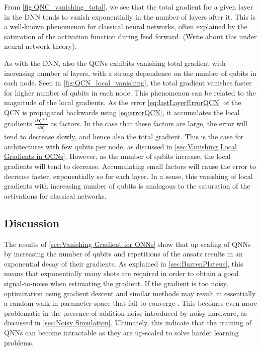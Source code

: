 From \autoref{fig:QNC_vanishing_total}, we see that the total gradient for a given layer in the DNN tends to vanish exponentially in the number of layers after it. This is a well-known phenomenon for classical neural networks, often explained by the saturation of the activation function during feed forward\cite{shalevshwartz2017failures}. (Write about this under neural network theory).

As with the DNN, also the QCNs exhibits vanishing total gradient with increasing number of layers, with a strong dependence on the number of qubits in each node. Seen in \autoref{fig:QCN_local_vanishing}, the total gradient vanishes faster for higher number of qubits in each node. This phenomenon can be related to the magnitude of the local gradients. As the error \autoref{eq:lastLayerErrorQCN} of the QCN is propagated backwards using \autoref{eq:errorQCN}, it accumulates the local gradients $\frac{\partial \boldsymbol{a}^{l+1}_k}{\partial \boldsymbol{a}^{l}_j}$ as factors. In the case that these factors are large, the error will tend to decrease slowly, and hence also the total gradient. This is the case for architectures with few qubits per node, as discussed in \autoref{sec:Vanishing Local Gradients in QCNs}. However, as the number of qubits increase, the local gradients will tend to decrease. Accumulating small factors will cause the error to decrease faster, exponentially so for each layer. In a sense, this vanishing of local gradients with increasing number of qubits is analogous to the saturation of the activations for classical networks.

\subsection{Discussion}\label{sec:Vanishing Gradient Phenomenon Discussion}
The results of \autoref{sec:Vanishing Gradient for QNNs} show that up-scaling of QNNs by increasing the number of qubits and repetitions of the ansatz results in an exponential decay of their gradients. As explained in \autoref{sec:BarrenPlateus}, this means that exponentially many shots are required in order to obtain a good signal-to-noise when estimating the gradient. If the gradient is too noisy, optimization using gradient descent and similar methods may result in essentially a random walk in parameter space that fail to converge \cite{skolik2020layerwise}. This becomes even more problematic in the presence of addition noise introduced by noisy hardware, as discussed in \autoref{sec:Noisy Simulation}. Ultimately, this indicate that the training of QNNs can become intractable as they are up-scaled to solve harder learning problems.    

